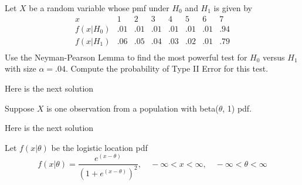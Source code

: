 \documentclass[12pt,letterpaper]{exam}
\begin{document}
\begin{questions}
	\setcounter{question}{20-1}
	
	\question 
	Let $X$ be a random variable whose pmf under $H_0$ and $H_1$ is given by
	$$
	\begin{array}{cccccccc}
		x & 1 & 2 & 3 & 4 & 5 & 6 & 7 \\ \hline
		f(x|H_0) & .01 & .01 & .01 & .01 & .01 & .01 & .94 \\
		f(x|H_1) & .06 & .05 & .04 & .03 & .02 & .01 & .79 \\
	\end{array}
	$$
	Use the Neyman-Pearson Lemma to find the most powerful test for $H_0$ versus $H_1$ with size $\alpha = .04$. 
	Compute the probability of Type II Error for this test.

	\begin{solution}
		Here is the next solution
	\end{solution}
	
	\setcounter{question}{23-1}
	
	\question 
	Suppose $X$ is one observation from a population with beta($\theta$, 1) pdf.
	
	\begin{solution}
		Here is the next solution
	\end{solution}
	
	\setcounter{question}{28-1}
	
	\question 
	Let $f(x|\theta)$ be the logistic location pdf
	$$
	f(x|\theta)
	= \frac{ e^{(x-\theta)} }{ (1 + e^{(x-\theta)})^2 }, \quad -\infty < x < \infty, \quad -\infty < \theta < \infty
	$$
	\begin{parts}

\end{parts}
\end{questions}
\end{document}
